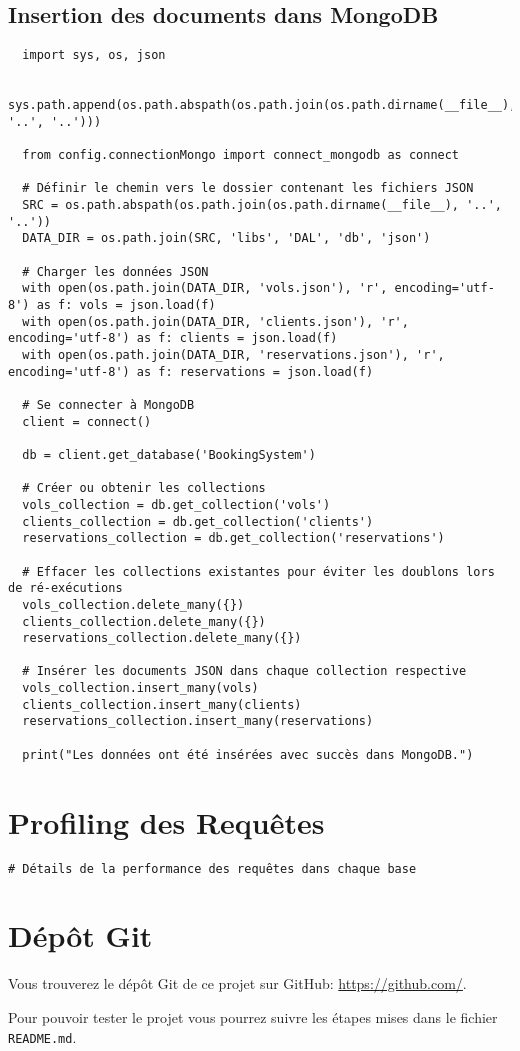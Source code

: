 \subsection{Insertion des documents dans MongoDB}
\label{ann:mongo_insert}
\begin{verbatim}
  import sys, os, json

  sys.path.append(os.path.abspath(os.path.join(os.path.dirname(__file__), '..', '..')))

  from config.connectionMongo import connect_mongodb as connect

  # Définir le chemin vers le dossier contenant les fichiers JSON
  SRC = os.path.abspath(os.path.join(os.path.dirname(__file__), '..', '..'))
  DATA_DIR = os.path.join(SRC, 'libs', 'DAL', 'db', 'json')

  # Charger les données JSON
  with open(os.path.join(DATA_DIR, 'vols.json'), 'r', encoding='utf-8') as f: vols = json.load(f)
  with open(os.path.join(DATA_DIR, 'clients.json'), 'r', encoding='utf-8') as f: clients = json.load(f)
  with open(os.path.join(DATA_DIR, 'reservations.json'), 'r', encoding='utf-8') as f: reservations = json.load(f)

  # Se connecter à MongoDB
  client = connect()

  db = client.get_database('BookingSystem')

  # Créer ou obtenir les collections
  vols_collection = db.get_collection('vols')
  clients_collection = db.get_collection('clients')
  reservations_collection = db.get_collection('reservations')

  # Effacer les collections existantes pour éviter les doublons lors de ré-exécutions
  vols_collection.delete_many({})
  clients_collection.delete_many({})
  reservations_collection.delete_many({})

  # Insérer les documents JSON dans chaque collection respective
  vols_collection.insert_many(vols)
  clients_collection.insert_many(clients)
  reservations_collection.insert_many(reservations)

  print("Les données ont été insérées avec succès dans MongoDB.")
\end{verbatim}

\section{Profiling des Requêtes}
\label{ann:profiling}
\begin{verbatim}
# Détails de la performance des requêtes dans chaque base
\end{verbatim}

\section{Dépôt Git}
\label{ann:git_repo}
Vous trouverez le dépôt Git de ce projet sur GitHub: \url{https://github.com/}.

Pour pouvoir tester le projet vous pourrez suivre les étapes mises dans le fichier \texttt{README.md}.